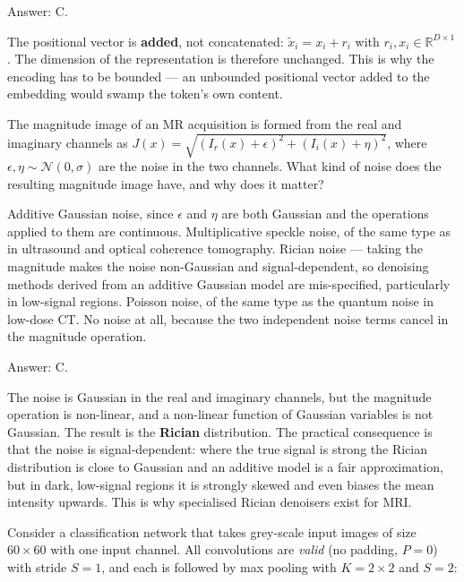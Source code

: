 \documentclass[11pt]{exam}
\begin{document}
\begin{questions}
\begin{solution}
  Answer: C.

  The positional vector is \textbf{added}, not concatenated: $\tilde{x}_i = x_i + r_i$ with
  $r_i, x_i \in \mathbb{R}^{D \times 1}$. The dimension of the representation is therefore
  unchanged. This is why the encoding has to be bounded --- an unbounded positional vector added to
  the embedding would swamp the token's own content.
\end{solution}

\question
The magnitude image of an MR acquisition is formed from the real and imaginary channels as
$J(x) = \sqrt{(I_r(x) + \epsilon)^2 + (I_i(x) + \eta)^2}$, where $\epsilon, \eta \sim
\mathcal{N}(0, \sigma)$ are the noise in the two channels. What kind of noise does the resulting
magnitude image have, and why does it matter?

\begin{choices}
  \choice Additive Gaussian noise, since $\epsilon$ and $\eta$ are both Gaussian and the operations
  applied to them are continuous.
  \choice Multiplicative speckle noise, of the same type as in ultrasound and optical coherence
  tomography.
  \choice Rician noise --- taking the magnitude makes the noise non-Gaussian and signal-dependent,
  so denoising methods derived from an additive Gaussian model are mis-specified, particularly in
  low-signal regions.
  \choice Poisson noise, of the same type as the quantum noise in low-dose CT.
  \choice No noise at all, because the two independent noise terms cancel in the magnitude
  operation.
\end{choices}

\begin{solution}
  Answer: C.

  The noise is Gaussian in the real and imaginary channels, but the magnitude operation is
  non-linear, and a non-linear function of Gaussian variables is not Gaussian. The result is the
  \textbf{Rician} distribution. The practical consequence is that the noise is signal-dependent:
  where the true signal is strong the Rician distribution is close to Gaussian and an additive
  model is a fair approximation, but in dark, low-signal regions it is strongly skewed and even
  biases the mean intensity upwards. This is why specialised Rician denoisers exist for MRI.
\end{solution}

\question
Consider a classification network that takes grey-scale input images of size $60 \times 60$ with
one input channel. All convolutions are \emph{valid} (no padding, $P = 0$) with stride
$S = 1$, and each is followed by max pooling with $K = 2 \times 2$ and $S = 2$:


\end{questions}
\end{document}
